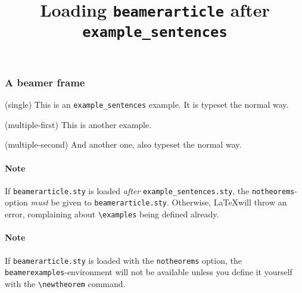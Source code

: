 \documentclass{article}
\title{Loading \texttt{beamerarticle} after \texttt{example\_sentences}}
\date{}
\author{}
\begin{document}
	\maketitle
	\begin{frame}
		\frametitle{A beamer frame}
		\begin{examples}
			\item(single) This is an \texttt{example\_sentences} example. It is typeset the normal way.
		\end{examples}
		\begin{examples}
		 	 \item(multiple-first) This is another example.
		 	 \item(multiple-second) And another one, also typeset the normal way.
		\end{examples}
	\end{frame}
    
    \paragraph{Note} If \texttt{beamerarticle.sty} is loaded \emph{after} \texttt{example\_sentences.sty}, the \texttt{notheorems}-option \emph{must} be given to \texttt{beamerarticle.sty}. Otherwise, \LaTeX will throw an error, complaining about \verb|\examples| being defined already.

    \paragraph{Note} If \texttt{beamerarticle.sty} is loaded with the \texttt{notheorems} option, the \texttt{beamerexamples}-environment will not be available unless you define it yourself with the
    \verb|\newtheorem| command.
\end{document}
